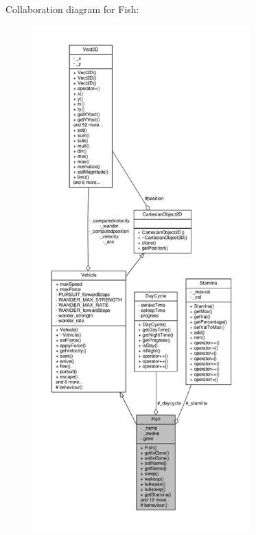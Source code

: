Collaboration diagram for Fish\+:\nopagebreak
\begin{figure}[H]
\begin{center}
\leavevmode
\includegraphics[height=550pt]{classFish__coll__graph}
\end{center}
\end{figure}

